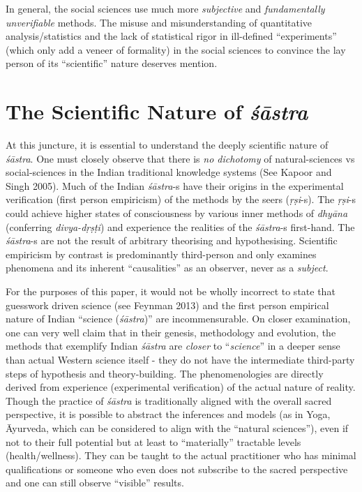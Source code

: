 In general, the social sciences use much more {\sl subjective} and {\sl fundamentally unverifiable} methods. The misuse and misunderstanding of quantitative analysis/statistics and the lack of statistical rigor in ill-defined ``experiments'' (which only add a veneer of formality) in the social sciences to convince the lay person of its ``scientific'' nature deserves mention.

\section*{The Scientific Nature of {\sl\bfseries śāstra}}

At this juncture, it is essential to understand the deeply scientific nature of {\sl śāstra}. One must closely observe that there is {\sl no dichotomy} of natural-sciences vs social-sciences in the Indian traditional knowledge systems (See Kapoor and Singh 2005). Much of the Indian {\sl śāstra}-s have their origins in the experimental verification (first person empiricism) of the methods by the seers ({\sl ṛṣi}-s). The {\sl ṛṣi}-s could achieve higher states of consciousness by various inner methods of {\sl dhyāna} (conferring {\sl divya-dṛṣṭi}) and experience the realities of the {\sl śāstra}-s first-hand. The {\sl śāstra}-s are not the result of arbitrary theorising and hypothesising. Scientific empiricism by contrast is predominantly third-person and only examines phenomena and its inherent ``causalities'' as an observer, never as a {\sl subject}.

For the purposes of this paper, it would not be wholly incorrect to state that guesswork driven science (see Feynman 2013) and the first person empirical nature of Indian ``science ({\sl śāstra})'' are incommensurable. On closer examination, one can very well claim that in their genesis, methodology and  evolution, the methods that exemplify  Indian  {\sl śāstra} are {\sl closer} to ``{\sl science}'' in a deeper sense than actual Western science itself - they do not have the intermediate third-party steps of hypothesis and theory-building. The phenomenologies are directly derived from experience (experimental verification) of the actual nature of reality. Though the practice of {\sl śāstra} is traditionally aligned with the overall sacred perspective, it is possible to abstract the inferences and models (as in Yoga, Āyurveda, which can be considered to align with the ``natural sciences''), even if not to their full potential but at least to ``materially'' tractable levels (health/wellness). They can be taught to the actual practitioner who has minimal qualifications or someone who even does not subscribe to the sacred perspective and one can still observe ``visible'' results.

